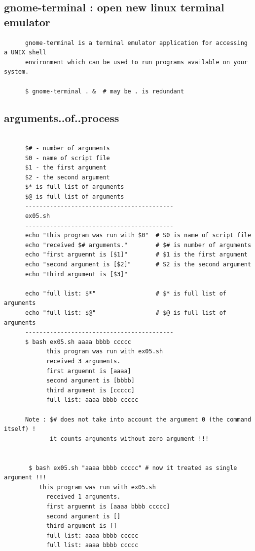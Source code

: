 \documentclass[a4paper,12pt]{article}
\begin{document}
\subsection{gnome-terminal :  open new linux terminal emulator  }
\begin{verbatim}
      gnome-terminal is a terminal emulator application for accessing a UNIX shell
      environment which can be used to run programs available on your system.
      
      $ gnome-terminal . &  # may be . is redundant
\end{verbatim}





\subsection{arguments..of..process  }
\begin{verbatim}

      $# - number of arguments
      S0 - name of script file
      $1 - the first argument
      $2 - the second argument
      $* is full list of arguments
      $@ is full list of arguments
      ------------------------------------------
      ex05.sh 
      ------------------------------------------
      echo "this program was run with $0"  # S0 is name of script file
      echo "received $# arguments."        # $# is number of arguments
      echo "first arguemnt is [$1]"        # $1 is the first argument
      echo "second argument is [$2]"       # S2 is the second argument
      echo "third argument is [$3]"

      echo "full list: $*"                 # $* is full list of arguments
      echo "full list: $@"                 # $@ is full list of arguments
      ------------------------------------------
      $ bash ex05.sh aaaa bbbb ccccc
            this program was run with ex05.sh
            received 3 arguments.
            first arguemnt is [aaaa]
            second argument is [bbbb]
            third argument is [ccccc]
            full list: aaaa bbbb ccccc
            
      Note : $# does not take into account the argument 0 (the command itself) !
             it counts arguments without zero argument !!!      
       
       
       $ bash ex05.sh "aaaa bbbb ccccc" # now it treated as single argument !!!
          this program was run with ex05.sh
            received 1 arguments.
            first arguemnt is [aaaa bbbb ccccc]
            second argument is [] 
            third argument is []
            full list: aaaa bbbb ccccc
            full list: aaaa bbbb ccccc

       
       
            
\end{verbatim}
\end{document}
